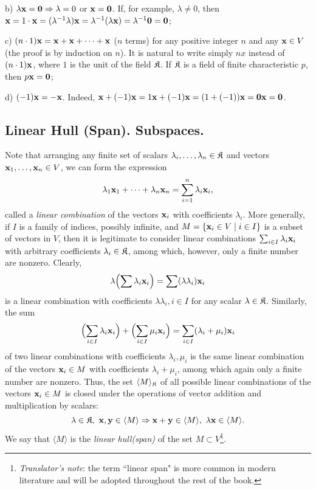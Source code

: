b) $\lambda \vx =\v0\Rightarrow \lambda =0$ or $\vx =\v0$. If, for example, $\lambda\ne 0$, then $\vx =1\cdot\vx =(\lambda^{-1}\lambda)\vx =\lambda^{-1}(\lambda\vx)=\lambda^{-1}\v0=\v0$;

c) $(n\cdot 1){\mathbf{x}} ={\mathbf{x}} +{\mathbf{x}} +\dots +{\mathbf{x}}$ ($n$ terms) for any positive integer $n$ and any ${\mathbf{x}}\in V$ (the proof is by induction on $n$). It is natural to write simply $nx$ instead of $(n\cdot 1){\mathbf{x}}$, where $1$ is the unit of the field ${\mathfrak{K}}$. If ${\mathfrak{K}}$ is a field of finite characteristic $p$, then $p\vx =\v0$;

d) $(-1){\mathbf{x}} =-{\mathbf{x}}$. Indeed, $\vx +(-1)\vx=1\vx+(-1)\vx =(1+(-1))\vx =\v0\vx=\v0$.

\subsection{Linear Hull (Span). Subspaces.}\label{sec:1.1-2}
Note that arranging any finite set of scalars $\lambda_i , \dots, \lambda_n \in {\mathfrak{K}}$ and vectors ${\mathbf{x}}_1, \dots , {\mathbf{x}}_n \in V$, we can form the expression
\[\lambda_1 {\mathbf{x}}_1 + \dots + \lambda_n {\mathbf{x}}_n =\sum_{i=1}^n \lambda_i {\mathbf{x}}_i ,\]
called a \textit{linear combination} of the vectors ${\mathbf{x}}_i$ with coefficients $\lambda_i$. More generally, if $I$ is a family of indices, possibly infinite, and $M = \{{\mathbf{x}}_i\in V\mid i\in I\}$ is a subset of vectors in $V$, then it is legitimate to consider linear combinations $\sum_{i\in I}\lambda_i {\mathbf{x}}_i$ with arbitrary coefficients $\lambda_i \in {\mathfrak{K}}$, among which, however, only a finite number are nonzero. Clearly, 
\[\lambda\Bigl(\sum \lambda_i{\mathbf{x}}_i\Bigr)=\sum (\lambda\lambda_i){\mathbf{x}}_i\]
is a linear combination with coefficients $\lambda\lambda_i , i\in I$ for any scalar $\lambda \in {\mathfrak{K}}$. Similarly, the sum
\[\Bigl(\sum_{i\in I}\lambda_i{\mathbf{x}}_i\Bigr)+\Bigl(\sum_{i\in I}\mu_i{\mathbf{x}}_i\Bigr)=\sum_{i\in I}(\lambda_i+\mu_i){\mathbf{x}}_i\]
of two linear combinations with coefficients $\lambda_i ,\mu_i$ is the same linear combination of the vectors ${\mathbf{x}}_i\in M$ with coefficients $\lambda_i +\mu_i$, among which again only a finite number are nonzero. Thus, the set $\langle M\rangle_{\mathfrak{K}}$ of all possible linear combinations of the vectors ${\mathbf{x}}_i\in M$ is closed under the operations of vector addition and multiplication by scalars:
\[\lambda\in {\mathfrak{K}},~{{\mathbf{x}},\mathbf y}\in \langle M\rangle\Rightarrow {{\mathbf{x}}+\mathbf y} \in \langle M\rangle,~{\lambda {\mathbf{x}}}\in \langle M\rangle.\]
We say that $\langle M\rangle$ is the \textit{linear hull(span)} of the set $M\subset V$\footnote{\textit{Translator's note}: the term ``linear span" is more common in modern literature and will be adopted throughout the rest of the book.}.


